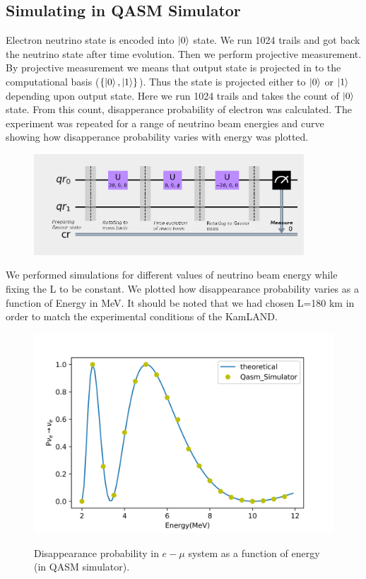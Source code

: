 \documentclass[12pt,a4paper]{report}
\begin{document}
\subsection{Simulating in QASM Simulator}
Electron neutrino state is encoded into $\ket{0}$ state. We run 1024 trails and got back the neutrino state after time evolution. Then we perform projective measurement. By projective measurement we means that output state is projected in to the computational basis ($\{\ket{0},\ket{1}\}$). Thus the state is projected either to $\ket{0}$ or $\ket{1}$ depending upon output state. Here we run 1024 trails and takes the count of $\ket{0}$ state. From this count, disapperance probability of electron was calculated. The experiment was repeated for a range of neutrino beam energies and curve showing how disapperance probability varies with energy was plotted.\par
\begin{figure}[h]
	\graphicspath{ {./Images/} }
	\centering	
	{\includegraphics[width=0.9\textwidth]{fig_2.png}}
 \end{figure}\par
We performed simulations for different values of neutrino beam energy while fixing the L to be constant. We plotted how disappearance probability varies as a function of Energy in MeV. It should be noted that we had chosen L=180 km in order to match the experimental conditions of the KamLAND. 
\begin{figure}[H]
	\graphicspath{ {./Images/} }
	\centering	
	{\includegraphics[scale=0.8]{fig_5.png}}
	\caption{Disappearance probability in $e-\mu$ system as a function of energy (in QASM simulator). }
	\label{fig 5}
\end{figure}\par
\end{document}
